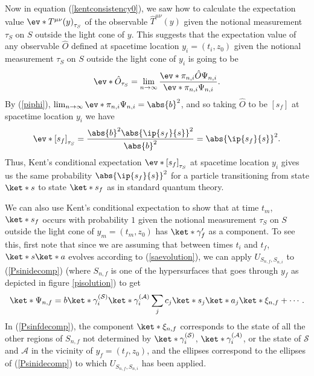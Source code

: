 \documentclass[12pt]{report}
\begin{document}
Now in equation (\ref{kentconsistency0}), we saw how to calculate the expectation value $\ev*{T^{\mu\nu}(y)}_{\tau_S}$ of the observable $\hat{T}^{\mu\nu}(y)$ given the notional measurement $\tau_S$ on $S$ outside the light cone of $y$. This suggests that the expectation value of any observable $\hat{O}$ defined at spacetime location $y_i=(t_i,z_0)$ given the notional measurement $\tau_S$ on $S$ outside the light cone of $y_i$ is going to be
\begin{equation}\label{kentevo}
\ev*{\hat{O}}_{\tau_S}=\lim_{n\rightarrow\infty}\frac{\ev*{\pi_{n,i}\hat{O}}{\Psi_{n,i}}}{\ev*{\pi_{n,i}}{\Psi_{n,i}}}.
\end{equation}
By (\ref{piphi}), $\lim_{n\rightarrow\infty}\ev*{\pi_{n,i}}{\Psi_{n,i}}=\abs{b}^2$, and so taking $\hat{O}$ to be $[s_f]$ at spacetime location $y_i$ we have 
$$ \ev*{[s_f]}_{\tau_S}=\frac{\abs{b}^2\abs{\ip{s_f}{s}}^2}{\abs{b}^2}=\abs{\ip{s_f}{s}}^2.$$
Thus, Kent's conditional expectation $\ev*{[s_f]}_{\tau_S}$ at spacetime location $y_i$ gives us the same probability $\abs{\ip{s_f}{s}}^2$ for a particle transitioning from state $\ket*{s}$ to state $\ket*{s_f}$ as in standard quantum theory.

We can also use Kent's conditional expectation to show that at time $t_m$, $\ket*{s_f}$ occurs with probability $1$ given the notional measurement $\tau_S$ on $S$ outside the light cone of $y_m=(t_m,z_0)$ has $\ket*{\gamma_f'}$ as a component. To see this, first note that since we are assuming that between times $t_i$ and $t_f$, $\ket*{s}\ket*{a}$ evolves according to (\ref{saevolution}), we can apply $U_{S_{n,f},S_{n,i}}$ to (\ref{Psinidecomp}) (where $S_{n,f}$ is one of the hypersurfaces that goes through $y_f$ as depicted in figure \ref{pisolution}) to get
\begin{equation}\label{Psinfdecomp}
	\ket*{\Psi_{n,f}}=b\ket*{\gamma_i^{(\mathcal{S})}}\ket*{\gamma_i^{(\mathcal{A})}}\sum_j c_j \ket*{s_j}\ket*{a_j}\ket*{\xi_{n,f}}+\cdots.
	\end{equation} 
In (\ref{Psinfdecomp}), the component $\ket*{\xi_{n,f}}$ %
%
corresponds to the state of all the other regions of $S_{n,f}$ not determined by $\ket*{\gamma_i^{(\mathcal{S})}}$, $\ket*{\gamma_i^{(\mathcal{A})}}$, or the state of $\mathcal{S}$ and $\mathcal{A}$ in the vicinity of $y_f=(t_f, z_0)$, and the ellipses correspond to the ellipses of (\ref{Psinidecomp}) to which $U_{S_{n,f},S_{n,i}}$ has been applied. 
\end{document}
